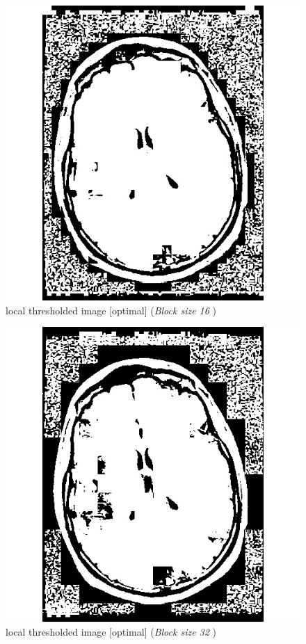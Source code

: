 \documentclass[letterpaper, 12 pt, conference ,onecolumn]{ieeeconf}  %
\begin{document}
\begin{figure}[h!]
\includegraphics[width=0.4\paperwidth]{optimal-thresholding/local/MRI-local-threshold16.jpg}
\centering
\caption{local thresholded image [optimal] (\textit{Block size 16 }) }
\label{fig:MRI-local-threshold16}
\end{figure}


\begin{figure}[h!]
\includegraphics[width=0.4\paperwidth]{optimal-thresholding/local/MRI-local-threshold32.jpg}
\centering
\caption{local thresholded image [optimal] (\textit{Block size 32 }) }
\label{fig:MRI-local-threshold32}
\end{figure}
\end{document}
